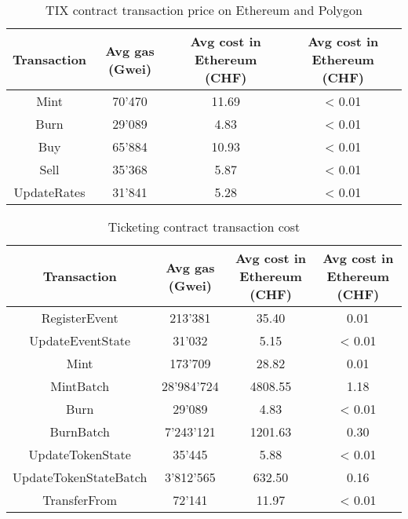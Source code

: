 \documentclass[a4paper,11pt,oneside]{report}
\begin{document}
\begin{table}[h!]
\begin{center}
\begin{NiceTabular}{ |c||c|c|c| }
 \hline
 Transaction & Avg gas (Gwei) & Avg cost in Ethereum (CHF) & Avg cost in Ethereum (CHF) \\
 \hline \hline
 Mint & 70'470 & 11.69 & < 0.01 \\
 Burn & 29'089 & 4.83 & < 0.01 \\
 Buy & 65'884 & 10.93 & < 0.01 \\
 Sell & 35'368 & 5.87 & < 0.01 \\
 UpdateRates & 31'841 & 5.28 & < 0.01 \\
 \hline
\end{NiceTabular}
\caption{TIX contract transaction price on Ethereum and Polygon}
\label{table:tix_contract_transaction_cost}
\end{center}
\end{table}

\begin{table}[h!]
\begin{center}
\begin{NiceTabular}{ |c||c|c|c| }
 \hline
 Transaction & Avg gas (Gwei) & Avg cost in Ethereum (CHF) & Avg cost in Ethereum (CHF) \\
 \hline \hline
 RegisterEvent & 213'381 & 35.40 & 0.01 \\
 UpdateEventState & 31'032 & 5.15 & < 0.01 \\
 Mint & 173'709 & 28.82 & 0.01 \\
 MintBatch & 28'984'724 & 4808.55 & 1.18 \\
 Burn & 29'089 & 4.83 & < 0.01 \\
 BurnBatch & 7'243'121 & 1201.63 & 0.30 \\
 UpdateTokenState & 35'445 & 5.88 & < 0.01 \\
 UpdateTokenStateBatch & 3'812'565 & 632.50 & 0.16 \\
 TransferFrom & 72'141 & 11.97 & < 0.01 \\
 \hline
\end{NiceTabular}
\captionsetup{justification=centering}
\caption{Ticketing contract transaction cost}
\label{table:ticketing_contract_transcation_cost}
\end{center}
\end{table}
\end{document}
